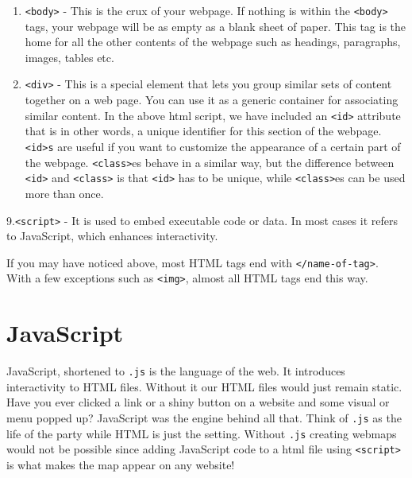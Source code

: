 \documentclass[
]{book}
\begin{document}
\begin{enumerate}
\item
  \texttt{\textless{}body\textgreater{}} - This is the crux of your webpage. If nothing is within the \texttt{\textless{}body\textgreater{}} tags, your webpage will be as empty as a blank sheet of paper. This tag is the home for all the other contents of the webpage such as headings, paragraphs, images, tables etc.
\item
  \texttt{\textless{}div\textgreater{}} - This is a special element that lets you group similar sets of content together on a web page. You can use it as a generic container for associating similar content. In the above html script, we have included an \texttt{\textless{}id\textgreater{}} attribute that is in other words, a unique identifier for this section of the webpage. \texttt{\textless{}id\textgreater{}s} are useful if you want to customize the appearance of a certain part of the webpage. \texttt{\textless{}class\textgreater{}}es behave in a similar way, but the difference between \texttt{\textless{}id\textgreater{}} and \texttt{\textless{}class\textgreater{}} is that \texttt{\textless{}id\textgreater{}} has to be unique, while \texttt{\textless{}class\textgreater{}}es can be used more than once.
\end{enumerate}

9.\texttt{\textless{}script\textgreater{}} - It is used to embed executable code or data. In most cases it refers to JavaScript, which enhances interactivity.

If you may have noticed above, most HTML tags end with \texttt{\textless{}/name-of-tag\textgreater{}}. With a few exceptions such as \texttt{\textless{}img\textgreater{}}, almost all HTML tags end this way.

\hypertarget{javascript}{%
\section{JavaScript}\label{javascript}}

JavaScript, shortened to \texttt{.js} is the language of the web. It introduces interactivity to HTML files. Without it our HTML files would just remain static. Have you ever clicked a link or a shiny button on a website and some visual or menu popped up? JavaScript was the engine behind all that. Think of \texttt{.js} as the life of the party while HTML is just the setting. Without \texttt{.js} creating webmaps would not be possible since adding JavaScript code to a html file using \texttt{\textless{}script\textgreater{}} is what makes the map appear on any website!
\end{document}

